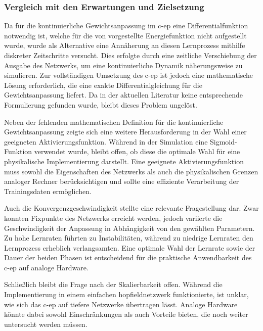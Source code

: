 \subsubsection{Vergleich mit den Erwartungen und Zielsetzung}

Da für die kontinuierliche Gewichtsanpassung im \gls{c-ep} eine Differentialfunktion notwendig ist, welche für die von \citeauthor{Scellier2017} vorgestellte Energiefunktion nicht aufgestellt wurde, wurde als Alternative eine Annäherung an diesen Lernprozess mithilfe diskreter Zeitschritte versucht. Dies erfolgte durch eine zeitliche Verschiebung der Ausgabe des Netzwerks, um eine kontinuierliche Dynamik näherungsweise zu simulieren. Zur vollständigen Umsetzung des \gls{c-ep} ist jedoch eine mathematische Lösung erforderlich, die eine exakte Differentialgleichung für die Gewichtsanpassung liefert. Da in der aktuellen Literatur keine entsprechende Formulierung gefunden wurde, bleibt dieses Problem ungelöst.

Neben der fehlenden mathematischen Definition für die kontinuierliche Gewichtsanpassung zeigte sich eine weitere Herausforderung in der Wahl einer geeigneten Aktivierungsfunktion. Während in der Simulation eine Sigmoid-Funktion verwendet wurde, bleibt offen, ob diese die optimale Wahl für eine physikalische Implementierung darstellt. Eine geeignete Aktivierungsfunktion muss sowohl die Eigenschaften des Netzwerks als auch die physikalischen Grenzen analoger Rechner berücksichtigen und sollte eine effiziente Verarbeitung der Trainingsdaten ermöglichen.

Auch die Konvergenzgeschwindigkeit stellte eine relevante Fragestellung dar. Zwar konnten Fixpunkte des Netzwerks erreicht werden, jedoch variierte die Geschwindigkeit der Anpassung in Abhängigkeit von den gewählten Parametern. Zu hohe Lernraten führten zu Instabilitäten, während zu niedrige Lernraten den Lernprozess erheblich verlangsamten. Eine optimale Wahl der Lernrate sowie der Dauer der beiden Phasen ist entscheidend für die praktische Anwendbarkeit des \gls{c-ep} auf analoge Hardware.

Schließlich bleibt die Frage nach der Skalierbarkeit offen. Während die Implementierung in einem einfachen \gls{hopfieldnetzwerk} funktionierte, ist unklar, wie sich das \gls{c-ep} auf tiefere Netzwerke übertragen lässt. Analoge Hardware könnte dabei sowohl Einschränkungen als auch Vorteile bieten, die noch weiter untersucht werden müssen.
